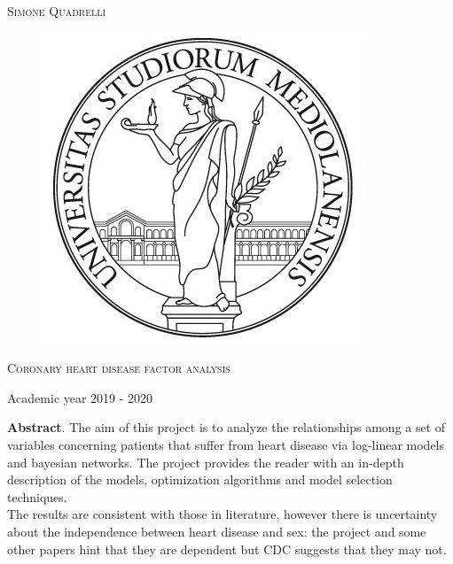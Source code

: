\documentclass{article}
\begin{document}
\begin{titlepage}
	
	
	\begin{center}
		\vspace{2 cm}
		{\Large \textsc{Simone Quadrelli} }
	\end{center}
	
	
	\begin{figure}[H]
		\vspace{2 cm}
		\centering
		\includegraphics[width=0.30\linewidth]{tesiSCIENZE_TECNOLOGIE.jpg}
		
	\end{figure}
	
	\begin{center}
		\vspace{2 cm}
		{\Large \textsc{Coronary heart disease factor analysis} }
	\end{center}

	\par
	\vspace{3 cm}
	
	\begin{center}
		{\large Academic year 2019 - 2020}
	\end{center}
\end{titlepage}



\newpage 
{}
\tableofcontents
\listoffigures
\newpage

\textbf{Abstract}. The aim of this project is to analyze the relationships among a set of variables concerning patients that suffer from heart disease via log-linear models and bayesian networks. The project provides the reader with an in-depth description of the models, optimization algorithms and model selection techniques. \\
The results are consistent with those in literature, however there is uncertainty about the independence between heart disease and sex: the project and some other papers hint that they are dependent but CDC suggests that they may not. 
\end{document}
